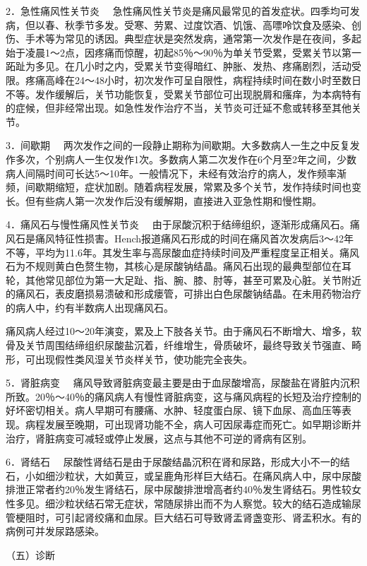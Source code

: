{2．急性痛风性关节炎}
　急性痛风性关节炎是痛风最常见的首发症状。四季均可发病，但以春、秋季节多发。受寒、劳累、过度饮酒、饥饿、高嘌呤饮食及感染、创伤、手术等为常见的诱因。典型症状是突然发病，通常第一次发作是在夜间，多起始于凌晨1～2点，因疼痛而惊醒，初起85％～90％为单关节受累，受累关节以第一跖趾为多见。在几小时之内，受累关节变得暗红、肿胀、发热、疼痛剧烈，活动受限。疼痛高峰在24～48小时，初次发作可呈自限性，病程持续时间在数小时至数日不等。发作缓解后，关节功能恢复，受累关节部位可出现脱屑和瘙痒，为本病特有的症候，但非经常出现。如急性发作治疗不当，关节炎可迁延不愈或转移至其他关节。

{3．间歇期}
　两次发作之间的一段静止期称为间歇期。大多数病人一生之中反复发作多次，个别病人一生仅发作1次。多数病人第二次发作在6个月至2年之间，少数病人间隔时间可长达5～10年。一般情况下，未经有效治疗的病人，发作频率渐频，间歇期缩短，症状加剧。随着病程发展，常累及多个关节，发作持续时间也变长。但有些病人第一次发作后没有缓解期，直接进入亚急性期和慢性期。

{4．痛风石与慢性痛风性关节炎}
　由于尿酸沉积于结缔组织，逐渐形成痛风石。痛风石是痛风特征性损害。Hench报道痛风石形成的时间在痛风首次发病后3～42年不等，平均为11.6年。其发生率与高尿酸血症持续时间及严重程度呈正相关。痛风石为不规则黄白色赘生物，其核心是尿酸钠结晶。痛风石出现的最典型部位在耳轮，其他常见部位为第一大足趾、指、腕、膝、肘等，甚至可累及心脏。关节附近的痛风石，表皮磨损易溃破和形成瘘管，可排出白色尿酸钠结晶。在未用药物治疗的病人中，约有半数病人出现痛风石。

痛风病人经过10～20年演变，累及上下肢各关节。由于痛风石不断增大、增多，软骨及关节周围结缔组织尿酸盐沉着，纤维增生，骨质破坏，最终导致关节强直、畸形，可出现假性类风湿关节炎样关节，使功能完全丧失。

{5．肾脏病变}
　痛风导致肾脏病变最主要是由于血尿酸增高，尿酸盐在肾脏内沉积所致。20％～40％的痛风病人有慢性肾脏病变，这与痛风病程的长短及治疗控制的好坏密切相关。病人早期可有腰痛、水肿、轻度蛋白尿、镜下血尿、高血压等表现。病程发展至晚期，可出现肾功能不全，病人可因尿毒症而死亡。如早期诊断并治疗，肾脏病变可减轻或停止发展，这点与其他不可逆的肾病有区别。

{6．肾结石}
　尿酸性肾结石是由于尿酸结晶沉积在肾和尿路，形成大小不一的结石，小如细沙粒状，大如黄豆，或呈鹿角形样巨大结石。在痛风病人中，尿中尿酸排泄正常者约20％发生肾结石，尿中尿酸排泄增高者约40％发生肾结石。男性较女性多见。细沙粒状结石常无症状，常随尿排出而不为人察觉。较大的结石造成输尿管梗阻时，可引起肾绞痛和血尿。巨大结石可导致肾盂肾盏变形、肾盂积水。有的病例可并发尿路感染。

（五）诊断

